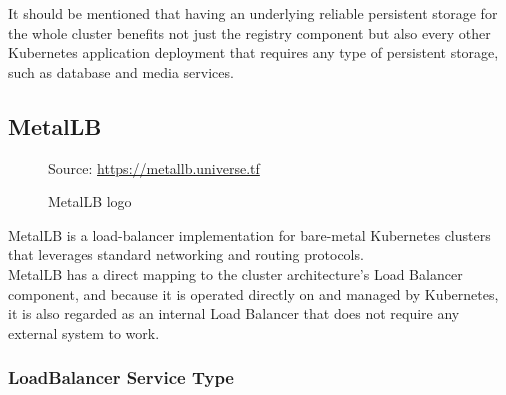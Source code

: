 It should be mentioned that having an underlying reliable persistent storage for
the whole cluster benefits not just the registry component but also every other Kubernetes
application deployment that requires any type of persistent storage, such as
database and media services.

\subsection{MetalLB}
\label{subsec:implementation_dependencies_metallb}

\begin{figure} %
  \centering
  \def\stackalignment{l} %
  {\scriptsize \parbox[t]{\linewidth}{ Source: \url{https://metallb.universe.tf}} }
  \caption{MetalLB logo}
\end{figure}

MetalLB is a load-balancer implementation for bare-metal Kubernetes clusters
that leverages standard networking and routing protocols\cite{metallb}. \\ %
MetalLB has a direct mapping to the cluster architecture's Load Balancer component,
and because it is operated directly on and managed by Kubernetes, it is also regarded
as an internal Load Balancer that does not require any external system to work.

\subsubsection{LoadBalancer Service Type}
\label{subsubsec:implementation_dependencies_metallb__loadbalancer_service_type}

